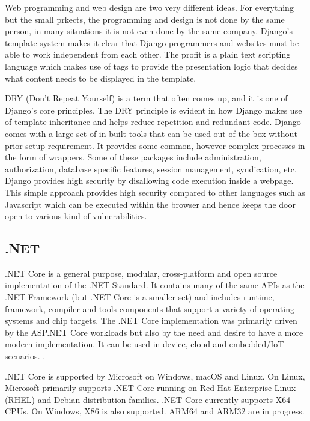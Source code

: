 \documentclass[../thesis.tex]{subfiles}
\begin{document}
Web programming and web design are two very different ideas. For everything but the small prkects, the programming and design is not done by the same person, in many situations it is not even done by the same company. Django's template system makes it clear that Django programmers and websites must be able to work independent from each other. The profit is a plain text scripting language which makes use of tags to provide the presentation logic that decides what content needs to be displayed in the template.

DRY (Don't Repeat Yourself) is a term that often comes up, and it is one of Django's core principles. The DRY principle is evident in how Django makes use of template inheritance and helps reduce repetition and redundant code. Django comes with a large set of in-built tools that can be used out of the box without prior setup requirement. It provides some common, however complex processes in the form of wrappers. Some of these packages include administration, authorization, database specific features, session management, syndication, etc.
Django provides high security by disallowing code execution inside a webpage. This simple approach provides high security compared to other languages such as Javascript which can be executed within the browser and hence keeps the door open to various kind of vulnerabilities.



\subsection{.NET}
    
.NET Core is a general purpose, modular, cross-platform and open source implementation of the .NET Standard. It contains many of the same APIs as the .NET Framework (but .NET Core is a smaller set) and includes runtime, framework, compiler and tools components that support a variety of operating systems and chip targets. The .NET Core implementation was primarily driven by the ASP.NET Core workloads but also by the need and desire to have a more modern implementation. It can be used in device, cloud and embedded/IoT scenarios. \cite{dotnet}.
\newline
    
.NET Core is supported by Microsoft on Windows, macOS and Linux. On Linux, Microsoft primarily supports .NET Core running on Red Hat Enterprise Linux (RHEL) and Debian distribution families. .NET Core currently supports X64 CPUs. On Windows, X86 is also supported. ARM64 and ARM32 are in progress.
\newline
    
\end{document}
